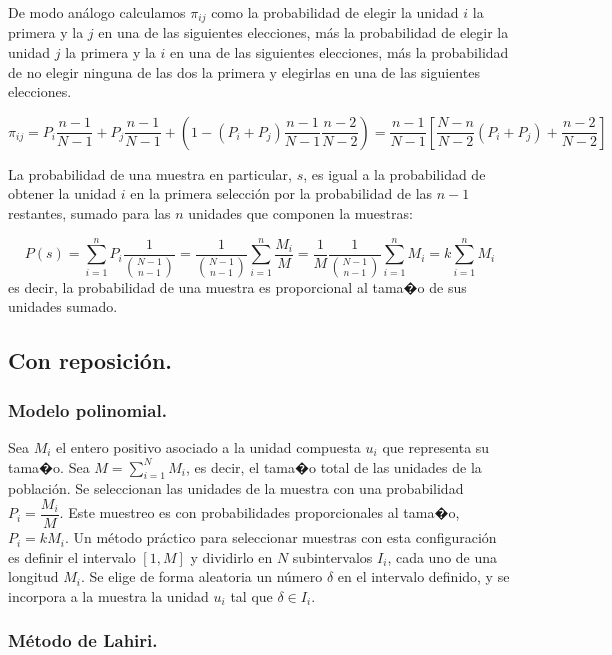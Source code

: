 De modo an\'alogo calculamos $\pi_{ij}$ como la probabilidad de elegir
la unidad $i$ la primera y la $j$ en una de las siguientes elecciones,
m\'as la probabilidad de elegir la unidad $j$ la primera y la $i$
en una de las siguientes elecciones, m\'as la probabilidad de no elegir
ninguna de las dos la primera y elegirlas en una de las siguientes
elecciones.

\[
\pi_{ij}=P_{i}\dfrac{n-1}{N-1}+P_{j}\dfrac{n-1}{N-1}+\left(1-\left(P_{i}+P_{j}\right)\dfrac{n-1}{N-1}\dfrac{n-2}{N-2}\right)=\dfrac{n-1}{N-1}\left[\dfrac{N-n}{N-2}\left(P_{i}+P_{j}\right)+\dfrac{n-2}{N-2}\right]
\]


La probabilidad de una muestra en particular, $s$, es igual a la
probabilidad de obtener la unidad $i$ en la primera selecci\'on por
la probabilidad de las $n-1$ restantes, sumado para las $n$ unidades
que componen la muestras:

\[
P\left(s\right)=\sum_{i=1}^{n}P_{i}\dfrac{1}{\binom{N-1}{n-1}}=\dfrac{1}{\binom{N-1}{n-1}}\sum_{i=1}^{n}\dfrac{M_{i}}{M}=\dfrac{1}{M}\dfrac{1}{\binom{N-1}{n-1}}\sum_{i=1}^{n}M_{i}=k\sum_{i=1}^{n}M_{i}
\]
 es decir, la probabilidad de una muestra es proporcional al tama�o
de sus unidades sumado.


\subsection{Con reposici\'on.}


\subsubsection{Modelo polinomial.}

Sea $M_{i}$ el entero positivo asociado a la unidad compuesta $u_{i}$
que representa su tama�o. Sea $M=\sum_{i=1}^{N}M_{i}$, es decir,
el tama�o total de las unidades de la poblaci\'on. Se seleccionan las
unidades de la muestra con una probabilidad $P_{i}=\dfrac{M_{i}}{M}$.
Este muestreo es con probabilidades proporcionales al tama�o, $P_{i}=kM_{i}$.
Un m\'etodo pr\'actico para seleccionar muestras con esta configuraci\'on
es definir el intervalo $\left[1,M\right]$ y dividirlo en $N$ subintervalos
$I_{i}$, cada uno de una longitud $M_{i}$. Se elige de forma aleatoria
un n\'umero $\delta$ en el intervalo definido, y se incorpora a la
muestra la unidad $u_{i}$ tal que $\delta\in I_{i}$.


\subsubsection{M\'etodo de Lahiri.}


